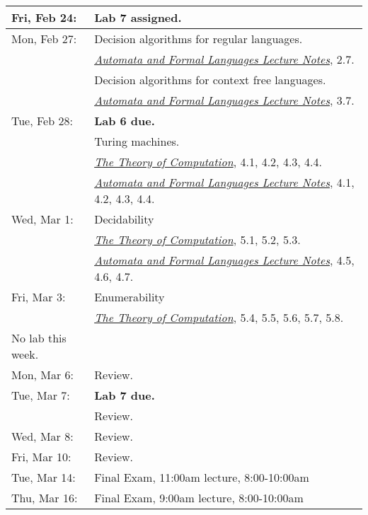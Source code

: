 \documentclass{article}
\newcommand{\theory}
           {\href{http://cg.scs.carleton.ca/~michiel/TheoryOfComputation/}
             {{\em The Theory of Computation}}}
\newcommand{\automata}
           {\href{http://users.utu.fi/jkari/automata/}
             {{\em Automata and Formal Languages Lecture Notes}}}
\begin{document}
\begin{longtable}{ll}
\\
Fri, Feb 24:
& {\bf Lab 7 assigned.}
\\\hline
Mon, Feb 27:
& Decision algorithms for regular languages. \\&\automata, 2.7.
\\& Decision algorithms for context free languages. \\&\automata, 3.7.
\\
Tue, Feb 28:
& {\bf Lab 6 due.}
\\& Turing machines.
\\& \theory, 4.1, 4.2, 4.3, 4.4.
\\& \automata, 4.1, 4.2, 4.3, 4.4.
\\
Wed, Mar 1:
& Decidability
\\& \theory, 5.1, 5.2, 5.3.
\\& \automata, 4.5, 4.6, 4.7.
\\
Fri, Mar 3:
& Enumerability
\\&\theory, 5.4, 5.5, 5.6, 5.7, 5.8.
\\\hline
No lab this week.
\\
Mon, Mar 6:& Review.
\\
Tue, Mar 7:& {\bf Lab 7 due.}
\\& Review.
\\
Wed, Mar 8:&  Review.
\\
Fri, Mar 10: & Review.
\\\hline
Tue, Mar 14: &  Final Exam, 11:00am lecture, 8:00-10:00am
\\
Thu, Mar 16: &  Final Exam, 9:00am lecture, 8:00-10:00am
\end{longtable}
\end{document}
